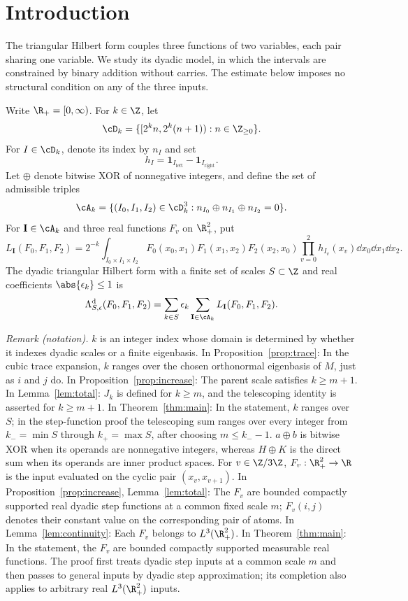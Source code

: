 \section{Introduction}\label{sec:introduction}

The triangular Hilbert form couples three functions of two variables,
each pair sharing one variable. We study its dyadic model, in which the
intervals are constrained by binary addition without carries. The
estimate below imposes no structural condition on any of the three
inputs.

Write \(\R_+=[0,\infty)\). For \(k\in\Z\), let
\[
 \cD_k=\{[2^kn,2^k(n+1)):n\in\Z_{\ge0}\}.
\]
For \(I\in\cD_k\), denote its index by \(n_I\) and set
\[
 h_I=\mathbf1_{I_{\mathrm{left}}}-\mathbf1_{I_{\mathrm{right}}}.
\]
Let \(\oplus\) denote bitwise XOR of nonnegative integers, and define
the set of admissible triples
\[
 \cA_k=\{(I_0,I_1,I_2)\in\cD_k^3:
                  n_{I_0}\oplus n_{I_1}\oplus n_{I_2}=0\}.
\]
For \(\mathbf I\in\cA_k\) and three real functions \(F_v\) on
\(\R_+^2\), put
\begin{equation}\label{eq:local-form}
 L_{\mathbf I}(F_0,F_1,F_2)
 =2^{-k}\int_{I_0\times I_1\times I_2}
 F_0(x_0,x_1)F_1(x_1,x_2)F_2(x_2,x_0)
 \prod_{v=0}^2 h_{I_v}(x_v)\dd x_0\dd x_1\dd x_2.
\end{equation}
The dyadic triangular Hilbert form with a finite set of scales
\(S\subset\Z\) and real coefficients \(\abs{\epsilon_k}\le1\) is
\begin{equation}\label{eq:given-form}
 \Lambda^{\mathrm d}_{S,\epsilon}(F_0,F_1,F_2)
 =\sum_{k\in S}\epsilon_k\sum_{\mathbf I\in\cA_k}
                  L_{\mathbf I}(F_0,F_1,F_2).
\end{equation}

\noindent\textit{Remark (notation).} $k$ is an integer index whose domain is determined by whether it indexes dyadic scales or a finite eigenbasis. In Proposition~\ref{prop:trace}: In the cubic trace expansion, $k$ ranges over the chosen orthonormal eigenbasis of $M$, just as $i$ and $j$ do. In Proposition~\ref{prop:increase}: The parent scale satisfies $k\ge m+1$. In Lemma~\ref{lem:total}: $J_k$ is defined for $k\ge m$, and the telescoping identity is asserted for $k\ge m+1$. In Theorem~\ref{thm:main}: In the statement, $k$ ranges over $S$; in the step-function proof the telescoping sum ranges over every integer from $k_-=\min S$ through $k_+=\max S$, after choosing $m\le k_--1$. $a\oplus b$ is bitwise XOR when its operands are nonnegative integers, whereas $H\oplus K$ is the direct sum when its operands are inner product spaces. For $v\in\Z/3\Z$, $F_v:\R_+^2\to\R$ is the input evaluated on the cyclic pair $(x_v,x_{v+1})$. In Proposition~\ref{prop:increase}, Lemma~\ref{lem:total}: The $F_v$ are bounded compactly supported real dyadic step functions at a common fixed scale $m$; $F_v(i,j)$ denotes their constant value on the corresponding pair of atoms. In Lemma~\ref{lem:continuity}: Each $F_v$ belongs to $L^3(\R_+^2)$. In Theorem~\ref{thm:main}: In the statement, the $F_v$ are bounded compactly supported measurable real functions. The proof first treats dyadic step inputs at a common scale $m$ and then passes to general inputs by dyadic step approximation; its completion also applies to arbitrary real $L^3(\R_+^2)$ inputs.


